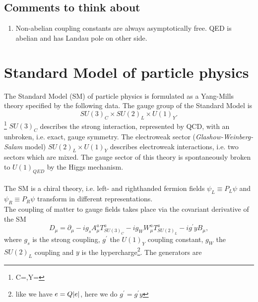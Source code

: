 \subsection{Comments to think about}
\begin{enumerate}
	\item Non-abelian coupling constants are always asymptotically free. QED is abelian and has Landau pole on other side.
\end{enumerate}

\section{Standard Model of particle physics}
The Standard Model (SM) of particle physics is formulated as a Yang-Mills theory specified by the following data.
The gauge group of the Standard Model is 
\begin{equation}
	SU(3)_C \times SU(2)_L \times U(1)_Y.
\end{equation}
\footnote{C=,Y=}
 $SU(3)_C$ describes the strong interaction, represented by QCD, with an unbroken, i.e. exact, gauge symmetry. The electroweak sector (\emph{Glashow-Weinberg-Salam} model) $SU(2)_L\times U(1)_Y$ describes electroweak interactions, i.e. two sectors which are mixed. The gauge sector of this theory is spontaneously broken to $U(1)_{QED}$ by the Higgs mechanism.\\
 \\
  The SM is a chiral theory, i.e.
 left- and righthanded fermion fields $ψ_L ≡ P_L ψ$ and $ψ_R ≡ P_R ψ$ transform in different representations. 
\\
The coupling of matter to gauge fields takes place via the covariant derivative of the SM
\begin{equation}
	D_\mu = \partial_\mu - i g_s A^a_\mu T^a_{SU(3)_C} - i g_W W^a_\mu T^a_{SU(2)_L} -i g^\prime y B_\mu,
\end{equation}
where $g_s$ is the strong coupling, $g^\prime$ the $U(1)_Y$ coupling constant, $g_W$ the $SU(2)_L$ coupling and $y$ is the hypercharge\footnote{like we have $e=Q \abs{e}$, here we do $g^\prime = g^\prime y$}. The generators are

